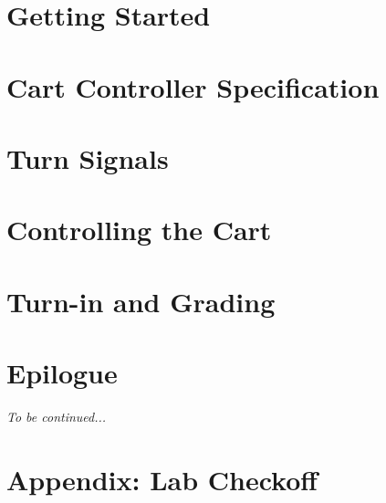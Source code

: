     \section{Getting Started} \label{sec:GettingStarted}        

    \section{Cart Controller Specification} \label{sec:spec}    

    \section{Turn Signals} \label{sec:turnSignals}              

    \section{Controlling the Cart} \label{sec:cartController}   

    \section{Turn-in and Grading}                               

    \section*{Epilogue}                                         \LauraDern

    \textit{To be continued...}

    \appendix

    \section{Appendix: Lab Checkoff}                            








